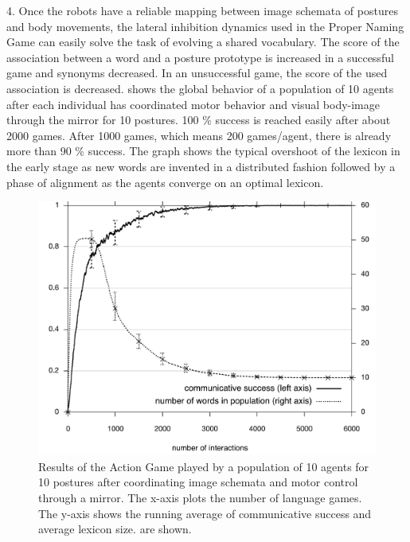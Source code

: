 4. Once the robots have a reliable mapping between image schemata of postures and body movements, the 
lateral inhibition dynamics used in the Proper Naming Game can easily solve the task of evolving 
a shared vocabulary. The score of the association between a word and a posture prototype is increased in a successful 
game and synonyms decreased. In an unsuccessful game, the score of the used association is decreased. 
shows the global behavior of a population of 10 agents after each individual has coordinated motor 
behavior and visual body-image through the mirror for 10 postures. 100 \% success is reached easily after about 
2000 games. After 1000 games, which means 200 games/agent, there is already more than 90 \% success. 
The graph shows the typical overshoot of the lexicon in the early stage 
as new words are invented in a distributed fashion followed by a phase 
of alignment as the agents converge on an optimal lexicon. 

\begin{figure}
\centerline{\includegraphics[width=0.6\linewidth]{chap11/figs/commsuccess}}
\caption{\label{commsuccess} \footnotesize{Results of the Action Game played by a population of 10 agents 
for 10 postures after coordinating image schemata and motor control through a mirror. 
The x-axis plots the number of language games. The y-axis shows the running average of 
communicative success and average lexicon size. 
are shown.}}
\end{figure}

